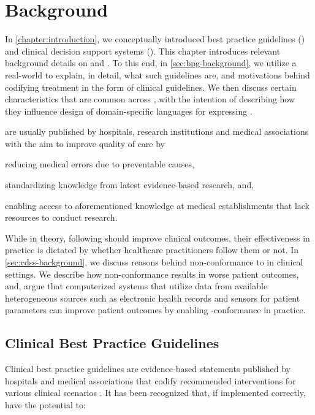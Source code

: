 \chapter{Background}\label{chapter:background}

In \autoref{chapter:introduction}, we conceptually introduced
best practice guidelines (\BPGs{}) and
clinical decision support systems (\CDSSs{}).
This chapter introduces relevant background details
on \BPGs{} and \CDSSs{}.
To this end, in \autoref{sec:bpg-background}, we utilize a real-world \BPG{}
to explain, in detail, what such guidelines are,
and motivations behind codifying treatment
in the form of clinical guidelines. We then discuss
certain characteristics that are common across \BPGs{},
with the intention of describing how they influence
design of domain-specific languages for expressing \BPGLogic{}.

\BPGs{} are usually published by hospitals,
research institutions and medical associations with the aim to improve quality of care by
\begin{enumerate*}[label=(\alph*)]
  \item reducing medical errors due to preventable causes,
  \item standardizing knowledge from latest evidence-based research, and,
  \item enabling access to aforementioned knowledge at medical establishments
  that lack resources to conduct research.
\end{enumerate*}

While in theory, following \BPGs{} should improve clinical outcomes,
their effectiveness in practice is dictated by whether healthcare practitioners
follow them or not. In \autoref{sec:cdss-background}, we discuss reasons behind
non-conformance to \BPGs{} in clinical settings. We describe how
non-conformance results in worse patient outcomes, and,
argue that computerized systems that utilize data from available
heterogeneous sources such as electronic health records and sensors for
patient parameters can improve patient outcomes by enabling
\BPG{}-conformance in practice.

\section{Clinical Best Practice Guidelines}\label{sec:bpg-background}

Clinical best practice guidelines are evidence-based statements
published by hospitals and medical associations that codify recommended
interventions for various clinical scenarios \cite{field1990clinical}.
It has been recognized that, if implemented correctly, \BPGs{} have the potential to:

